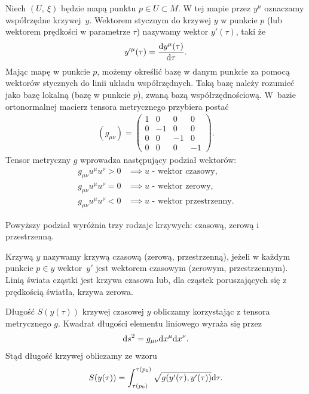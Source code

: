 \begin{definition}
Niech $(U,\ \xi)$ będzie mapą punktu $p\in U \subset M$. W tej mapie 
przez $y^\mu$ oznaczamy współrzędne krzywej~$y$.
Wektorem stycznym do krzywej $y$ w punkcie $p$  
(lub wektorem prędkości w 
parametrze $\tau$) nazywamy wektor $y'(\tau)$, taki że
\begin{align*}
y'^\mu (\tau )= \frac{\text{d} y^\mu (\tau) }{\text{d} \tau}.
\end{align*}
Mając mapę w punkcie $p$, możemy określić bazę w danym punkcie
za pomocą wektorów stycznych do linii układu współrzędnych.
Taką bazę należy rozumieć jako bazę lokalną (bazę w punkcie $p$), 
zwaną bazą współrzędnościową.
W~bazie ortonormalnej macierz tensora metrycznego
przybiera postać 
\begin{align*}
( g_{\mu\nu} ) = \left(
\begin{array}{cccc}
1 & 0 & 0 & 0\\
0 & -1 & 0 & 0 \\
0 & 0 & -1 & 0 \\
0 & 0 & 0 & -1 
\end{array}
\right).
\end{align*}
Tensor metryczny $g$ wprowadza następujący podział wektorów:
\begin{align*}
g_{\mu\nu}u^\mu u^\nu > 0& \implies u \text{ - wektor czasowy,}\\
g_{\mu\nu}u^\mu u^\nu = 0& \implies u \text{ - wektor zerowy,}\\
g_{\mu\nu}u^\mu u^\nu < 0& \implies u \text{ - wektor przestrzenny.}
\end{align*}
\end{definition}
\noindent
Powyższy podział wyróżnia trzy rodzaje krzywych: czasową, 
zerową i przestrzenną.
\begin{definition}
Krzywą $y$ nazywamy krzywą czasową (zerową, przestrzenną),
jeżeli w każdym punkcie $p \in y$ wektor~$y'$ jest 
wektorem czasowym
(zerowym, przestrzennym). Linią świata cząstki
jest krzywa czasowa lub, dla cząstek 
poruszających się z prędkością światła, 
krzywa zerowa.
\end{definition}
Długość $S(y(\tau))$ krzywej czasowej $y$ obliczamy 
korzystając z tensora metrycznego $g$. 
Kwadrat długości elementu liniowego wyraża się przez
\begin{align*}
\text{d} s^2 = g_{\mu\nu} \text{d} x^\mu \text{d} x^\nu.
\end{align*}
Stąd długość krzywej obliczamy ze wzoru
\begin{align}\label{dlugosc_krzywej}
S( y(\tau) ) = \int_{\tau(p_0)}^{\tau(p_1)} \sqrt{g (
y' (\tau), y' (\tau) )} \text{d} \tau.
\end{align}
